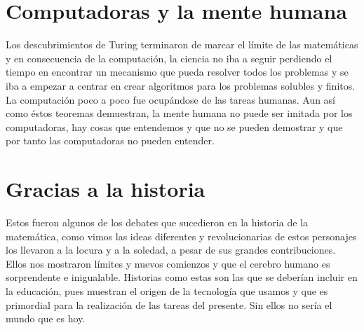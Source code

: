 ﻿\documentclass[journal,10pt,spanish]{IEEEtran}
\begin{document}
\section{Computadoras y la mente humana}

Los descubrimientos de Turing terminaron de marcar el límite de las matemáticas y en consecuencia de la computación, la ciencia no iba a seguir perdiendo el tiempo en encontrar un mecanismo que pueda resolver todos los problemas y se iba a empezar a centrar en crear algoritmos para los problemas solubles y finitos. La computación poco a poco fue ocupándose de las tareas humanas. Aun así como éstos teoremas demuestran, la mente humana no puede ser imitada por los computadoras, hay cosas que entendemos  y que no se pueden demostrar y  que por tanto las computadoras no pueden entender.

\section{Gracias a la historia}

Estos fueron algunos de los debates que sucedieron en la historia de la matemática, como vimos las ideas diferentes y revolucionarias de estos personajes  los llevaron a la locura y a la soledad, a pesar de sus grandes contribuciones. Ellos nos mostraron límites y nuevos comienzos y que el cerebro humano es sorprendente e inigualable. Historias como estas son las que se deberían incluir en la educación, pues muestran el origen de la tecnología que usamos y que es primordial para la realización de las tareas del presente. Sin ellos no sería el mundo que es hoy.



\end{document}
